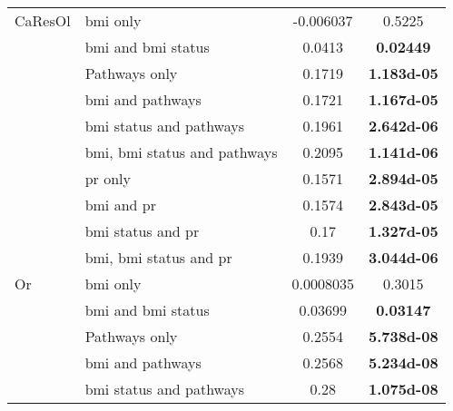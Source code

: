 \begin{ThreePartTable}
\begin{longtable}{llcc}
				\hline
				\rule{0pt}{2.25ex}CaResOl & \gls{bmi} only                           & -0.006037  & 0.5225                              \\
                                          & \gls{bmi} and \gls{bmi} status           & 0.0413     & \bfseries 0.02449                   \\
                                          & Pathways only                            & 0.1719     & \bfseries \num{1.183d-05}           \\
                                          & \gls{bmi} and pathways                   & 0.1721     & \bfseries \num{1.167d-05}           \\
                                          & \gls{bmi} status and pathways            & 0.1961     & \bfseries \num{2.642d-06}           \\
                                          & \gls{bmi}, \gls{bmi} status and pathways & 0.2095     & \bfseries \num{1.141d-06}           \\
                                          & \gls{pr} only                            & 0.1571     & \bfseries \num{2.894d-05}           \\
                                          & \gls{bmi} and \gls{pr}                   & 0.1574     & \bfseries \num{2.843d-05}           \\
                                          & \gls{bmi} status and \gls{pr}            & 0.17       & \bfseries \num{1.327d-05}           \\
                                          & \gls{bmi}, \gls{bmi} status and \gls{pr} & 0.1939     & \bfseries \num{3.044d-06}           \\
				\hline
				\rule{0pt}{2.25ex}Or      & \gls{bmi} only                           & 0.0008035  & 0.3015                              \\
                                          & \gls{bmi} and \gls{bmi} status           & 0.03699    & \bfseries 0.03147                   \\
                                          & Pathways only                            & 0.2554     & \bfseries \num{5.738d-08}           \\
                                          & \gls{bmi} and pathways                   & 0.2568     & \bfseries \num{5.234d-08}           \\
                                          & \gls{bmi} status and pathways            & 0.28       & \bfseries \num{1.075d-08}           \\

\end{longtable}
\end{ThreePartTable}
